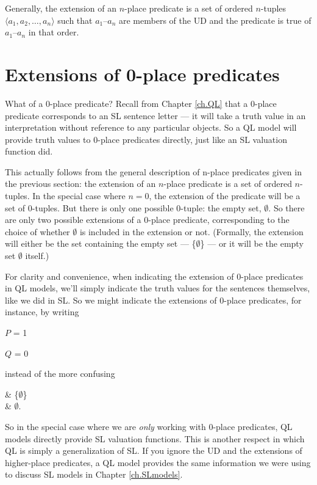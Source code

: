 Generally, the extension of an $n$-place predicate is a set of ordered $n$-tuples ${\langle}a_1, a_2,\ldots, a_n{\rangle}$ such that $a_1$--$a_n$ are members of the UD and the predicate is true of $a_1$--$a_n$ in that order.


\section{Extensions of 0-place predicates}
\label{sec.0PlaceModels}

What of a 0-place predicate? Recall from Chapter \ref{ch.QL} that a 0-place predicate corresponds to an SL sentence letter --- it will take a truth value in an interpretation without reference to any particular objects. So a QL model will provide truth values to 0-place predicates directly, just like an SL valuation function did.

This actually follows from the general description of n-place predicates given in the previous section: the extension of an $n$-place predicate is a set of ordered $n$-tuples. In the special case where $n=0$, the extension of the predicate will be a set of 0-tuples. But there is only one possible 0-tuple: the empty set, $\emptyset$. So there are only two possible extensions of a 0-place predicate, corresponding to the choice of whether $\emptyset$ is included in the extension or not. (Formally, the extension will either be the set containing the empty set --- \{$\emptyset$\} --- or it will be the empty set $\emptyset$ itself.)

For clarity and convenience, when indicating the extension of 0-place predicates in QL models, we'll simply indicate the truth values for the sentences themselves, like we did in SL. So we might indicate the extensions of 0-place predicates, for instance, by writing

\begin{ekey}
\item{$P$} = 1
\item{$Q$} = 0
\end{ekey}

instead of the more confusing

\begin{partialmodel}
	 & \{$\emptyset$\}\\
	 & $\emptyset$. \\
\end{partialmodel}

So in the special case where we are \emph{only} working with 0-place predicates, QL models directly provide SL valuation functions. This is another respect in which QL is simply a generalization of SL. If you ignore the UD and the extensions of higher-place predicates, a QL model provides the same information we were using to discuss SL models in Chapter \ref{ch.SLmodels}.

